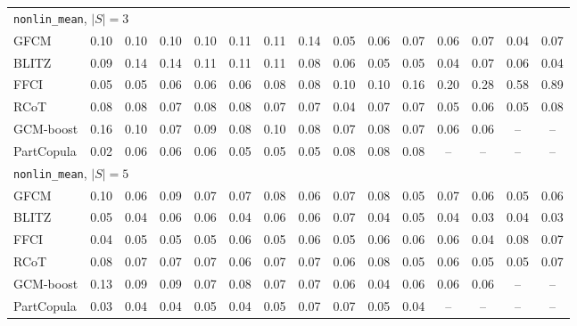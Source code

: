 \begin{longtable}{l*{14}{c}}
\midrule \multicolumn{15}{l}{\texttt{nonlin\_mean}, $|S|=3$}\\
GFCM & 0.10 & 0.10 & 0.10 & 0.10 & 0.11 & 0.11 & 0.14 & 0.05 & 0.06 & 0.07 & 0.06 & 0.07 & 0.04 & 0.07 \\
BLITZ & 0.09 & 0.14 & 0.14 & 0.11 & 0.11 & 0.11 & 0.08 & 0.06 & 0.05 & 0.05 & 0.04 & 0.07 & 0.06 & 0.04 \\
FFCI & 0.05 & 0.05 & 0.06 & 0.06 & 0.06 & 0.08 & 0.08 & 0.10 & 0.10 & 0.16 & 0.20 & 0.28 & 0.58 & 0.89 \\
RCoT & 0.08 & 0.08 & 0.07 & 0.08 & 0.08 & 0.07 & 0.07 & 0.04 & 0.07 & 0.07 & 0.05 & 0.06 & 0.05 & 0.08 \\
GCM-boost & 0.16 & 0.10 & 0.07 & 0.09 & 0.08 & 0.10 & 0.08 & 0.07 & 0.08 & 0.07 & 0.06 & 0.06 & -- & -- \\
PartCopula & 0.02 & 0.06 & 0.06 & 0.06 & 0.05 & 0.05 & 0.05 & 0.08 & 0.08 & 0.08 & -- & -- & -- & -- \\
\midrule \multicolumn{15}{l}{\texttt{nonlin\_mean}, $|S|=5$}\\
GFCM & 0.10 & 0.06 & 0.09 & 0.07 & 0.07 & 0.08 & 0.06 & 0.07 & 0.08 & 0.05 & 0.07 & 0.06 & 0.05 & 0.06 \\
BLITZ & 0.05 & 0.04 & 0.06 & 0.06 & 0.04 & 0.06 & 0.06 & 0.07 & 0.04 & 0.05 & 0.04 & 0.03 & 0.04 & 0.03 \\
FFCI & 0.04 & 0.05 & 0.05 & 0.05 & 0.06 & 0.05 & 0.06 & 0.05 & 0.06 & 0.06 & 0.06 & 0.04 & 0.08 & 0.07 \\
RCoT & 0.08 & 0.07 & 0.07 & 0.07 & 0.06 & 0.07 & 0.07 & 0.06 & 0.08 & 0.05 & 0.06 & 0.05 & 0.05 & 0.07 \\
GCM-boost & 0.13 & 0.09 & 0.09 & 0.07 & 0.08 & 0.07 & 0.07 & 0.06 & 0.04 & 0.06 & 0.06 & 0.06 & -- & -- \\
PartCopula & 0.03 & 0.04 & 0.04 & 0.05 & 0.04 & 0.05 & 0.07 & 0.07 & 0.05 & 0.04 & -- & -- & -- & -- \\
\end{longtable}
\normalsize\setlength{\tabcolsep}{6pt}

